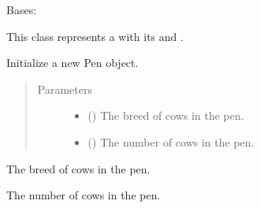 \documentclass[letterpaper,10pt,english]{sphinxmanual}
\begin{document}
\begin{fulllineitems}
\label{\detokenize{farming:farming.farm1.Pen}}
\sphinxAtStartPar
Bases: 

\sphinxAtStartPar
This class represents a  with its {\hyperref[\detokenize{farming:farming.farm1.Pen.breed}]{}} and {\hyperref[\detokenize{farming:farming.farm1.Pen.cow_count}]{}}.

\sphinxAtStartPar
Initialize a new Pen object.
\begin{quote}\begin{description}
\item[{Parameters}] \leavevmode\begin{itemize}
\item {} 
\sphinxAtStartPar
{} () \textendash{} The breed of cows in the pen.

\item {} 
\sphinxAtStartPar
{} () \textendash{} The number of cows in the pen.

\end{itemize}

\end{description}\end{quote}

\begin{fulllineitems}
\label{\detokenize{farming:farming.farm1.Pen.breed}}
\sphinxAtStartPar
The breed of cows in the pen.

\end{fulllineitems}


\begin{fulllineitems}
\label{\detokenize{farming:farming.farm1.Pen.cow_count}}
\sphinxAtStartPar
The number of cows in the pen.

\end{fulllineitems}


\end{fulllineitems}
\end{document}
